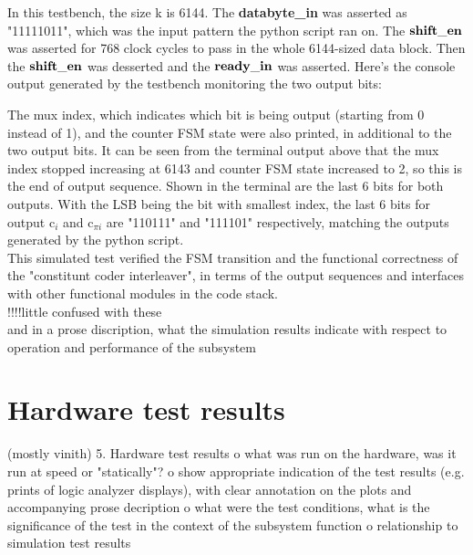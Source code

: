 \documentclass[letterpaper]{article} %
\begin{document}
In this testbench, the size k is 6144. The {\bf databyte\_in} was asserted as "11111011", which was the input pattern the python script ran on. The ${\bf  shift\_en}$ was asserted for 768 clock cycles to pass in the whole 6144-sized data block. Then the  ${\bf  shift\_en}$ was desserted and the ${\bf  ready\_in}$ was asserted. Here's the console output generated by the testbench monitoring the two output bits:

\begin{minipage}{1.0\textwidth}
\centering
{}
\centering
\end{minipage}
\bigskip

The mux index, which indicates which bit is being output (starting from 0 instead of 1), and the counter FSM state were also printed, in additional to the two output bits. It can be seen from the terminal output above that the mux index stopped increasing at 6143 and counter FSM state increased to 2, so this is the end of output sequence. Shown in the terminal are the last 6 bits for both outputs. With the LSB being the bit with smallest index, the last 6 bits for output c$_{i}$ and c$_{\pi i}$ are "110111" and "111101" respectively, matching the outputs generated by the python script.\\

This simulated test verified the FSM transition and the functional correctness of the "constitunt coder interleaver", in terms of the output sequences and interfaces with other functional modules in the code stack.\\

%    
!!!!little confused with these\\
and in a prose discription, what the simulation results indicate with
%             
respect to operation and performance of the subsystem

\section{Hardware test results}
(mostly vinith)
    5.  Hardware test results
         o  what was run on the hardware, was it run at speed or "statically"?
         o  show appropriate indication of the test results (e.g. prints of
            logic analyzer displays), with clear annotation on the plots and
            accompanying prose decription
         o  what were the test conditions, what is the significance of the test
            in the context of the subsystem function
         o  relationship to simulation test results
\end{document}
